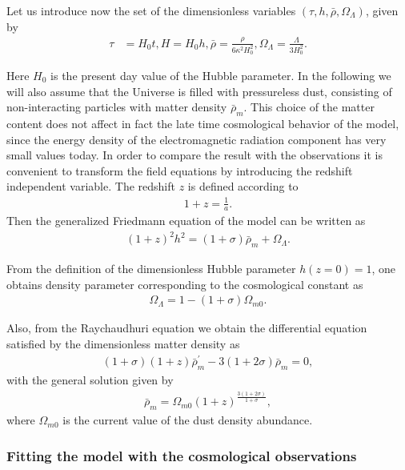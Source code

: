 \documentclass[aps,superscriptaddress, showpacs,preprintnumbers, superscriptaddress, nofootinbibt,twocolumn]{revtex4}
\begin{document}
Let us introduce now the set of the dimensionless variables $\left(\tau, h, \bar{\rho}, \Omega_{\Lambda}\right)$, given by
\begin{align}
\tau&=H_0t, H=H_0h,
\bar{\rho}=\frac{\rho}{6\kappa^2 H_0^2}, \Omega_{\Lambda}=\frac{\Lambda}{3H_0^2}.
\end{align}

Here $H_0$ is the present day value of the Hubble parameter. In the following we will also assume that the Universe is filled with pressureless dust, consisting of non-interacting particles with matter density $\bar{\rho}_m$. This choice of the matter content does not affect in fact the late time cosmological behavior of the model, since the energy density of the electromagnetic radiation component has very small values today. In order to compare the result with the observations it is convenient to transform the field equations by introducing the redshift independent variable. The redshift $z$ is defined according to
\begin{align}
1+z=\frac{1}{a}.
\end{align}
Then the generalized Friedmann equation of the model can be written as
\begin{align}
(1+z)^2h^2=(1+\sigma)\bar{\rho}_m+\Omega_{\Lambda}.
\end{align}

From the definition of the dimensionless Hubble parameter $h(z=0)=1$, one obtains density parameter corresponding to the cosmological constant as
\begin{align}
\Omega_{\Lambda}=1-(1+\sigma)\Omega_{m0}.
\end{align}

Also, from the Raychaudhuri equation we obtain the differential equation satisfied by the dimensionless matter density as
\begin{align}
(1+\sigma)(1+z)\bar\rho_m^\prime-3(1+2\sigma)\bar\rho_m=0,
\end{align}
with the general  solution given by
\begin{align}
\bar\rho_m=\Omega_{m0}(1+z)^{\frac{3(1+2\sigma)}{1+\sigma}},
\end{align}
where $\Omega_{m0}$ is the current value of the dust density abundance.

\subsubsection{Fitting the model with the cosmological observations}
\end{document}
